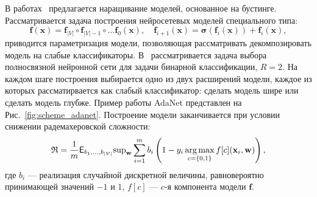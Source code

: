 В работах~\cite{boost_res,adanet} предлагается наращивание моделей, основанное на бустинге. Рассматривается задача построения нейросетевых моделей специального типа:
\[
    \mathbf{f}(\mathbf{x}) = \mathbf{f}_{|V|} \circ \mathbf{f}_{|V|-1} \circ \dots \mathbf{f}_0(\mathbf{x}), \quad  \mathbf{f}_{i+1}(\mathbf{x}) = \boldsymbol{\sigma}\left(\mathbf{f}_i(\mathbf{x})\right) + \mathbf{f}_i(\mathbf{x}),
\]
приводится параметризация модели, позволяющая рассматривать декомпозировать модель на слабые классификаторы.
В~\cite{adanet} рассматривается задача выбора полносвязной нейронной сети для задачи бинарной классификации, $R=2$. На каждом шаге построения выбирается одно из двух расширений модели, каждое из которых рассматирвается как слабый классификатор: сделать модель шире или сделать модель глубже. Пример работы AdaNet представлен на Рис.~\ref{fig:scheme_adanet}.
Построение модели заканчивается при условии снижении радемахеровской сложности:
\begin{equation}
\label{eq:rad}
    \mathfrak{R} = \frac{1}{m}\mathsf{E}_{{b}_1,\dots, {b}_{|V|}} \text{sup}_{\mathbf{w}} \sum_{i=1}^m   {b}_i \left(1 - y_i\operatorname*{arg\,max}_{c = \{0,1\}}f[c](\mathbf{x}_i, \mathbf{w})\right),
\end{equation}
где ${b}_i$ --- реализация случайной дискретной величины, равновероятно принимающей значений $-1$ и $1$, $f[c]$ --- $c$-я компонента модели $\mathbf{f}$.

